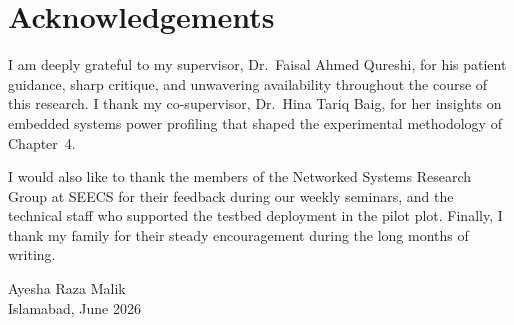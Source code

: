 \chapter*{Acknowledgements}
\thispagestyle{plain}

\noindent I am deeply grateful to my supervisor, Dr.\ Faisal Ahmed Qureshi, for his patient
guidance, sharp critique, and unwavering availability throughout the course of this research.
I thank my co-supervisor, Dr.\ Hina Tariq Baig, for her insights on embedded systems power
profiling that shaped the experimental methodology of Chapter~4.

I would also like to thank the members of the Networked Systems Research Group at SEECS for
their feedback during our weekly seminars, and the technical staff who supported the testbed
deployment in the pilot plot. Finally, I thank my family for their steady encouragement during
the long months of writing.

\vspace{20pt}
\begin{flushright}
Ayesha Raza Malik\\
Islamabad, June 2026
\end{flushright}

\tableofcontents
\listoffigures
\listoftables
